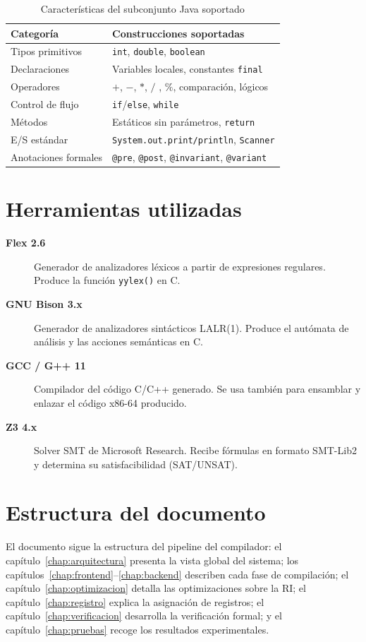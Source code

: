 \begin{table}[H]
  \centering
  \caption{Características del subconjunto Java soportado}
  \label{tab:lenguaje}
  \begin{tabularx}{\textwidth}{lX}
    \toprule
    \textbf{Categoría}   & \textbf{Construcciones soportadas} \\
    \midrule
    Tipos primitivos     & \texttt{int}, \texttt{double}, \texttt{boolean} \\
    Declaraciones        & Variables locales, constantes \texttt{final} \\
    Operadores           & $+$, $-$, $*$, $/$ , $\%$, comparación, lógicos \\
    Control de flujo     & \texttt{if}/\texttt{else}, \texttt{while} \\
    Métodos              & Estáticos sin parámetros, \texttt{return} \\
    E/S estándar         & \texttt{System.out.print/println}, \texttt{Scanner} \\
    Anotaciones formales & \texttt{@pre}, \texttt{@post}, \texttt{@invariant}, \texttt{@variant} \\
    \bottomrule
  \end{tabularx}
\end{table}

\section{Herramientas utilizadas}

\begin{description}
  \item[\textbf{Flex 2.6}] Generador de analizadores léxicos a partir de
    expresiones regulares. Produce la función \texttt{yylex()} en C.
  \item[\textbf{GNU Bison 3.x}] Generador de analizadores sintácticos LALR(1).
    Produce el autómata de análisis y las acciones semánticas en C.
  \item[\textbf{GCC / G++ 11}] Compilador del código C/C++ generado.
    Se usa también para ensamblar y enlazar el código x86-64 producido.
  \item[\textbf{Z3 4.x}] Solver SMT de Microsoft Research. Recibe fórmulas
    en formato SMT-Lib2 y determina su satisfacibilidad (SAT/UNSAT).
\end{description}

\section{Estructura del documento}

El documento sigue la estructura del pipeline del compilador:
el capítulo~\ref{chap:arquitectura} presenta la vista global del sistema;
los capítulos~\ref{chap:frontend}–\ref{chap:backend} describen cada fase
de compilación; el capítulo~\ref{chap:optimizacion} detalla las
optimizaciones sobre la RI; el capítulo~\ref{chap:registro} explica la
asignación de registros; el capítulo~\ref{chap:verificacion} desarrolla
la verificación formal; y el capítulo~\ref{chap:pruebas} recoge los
resultados experimentales.

